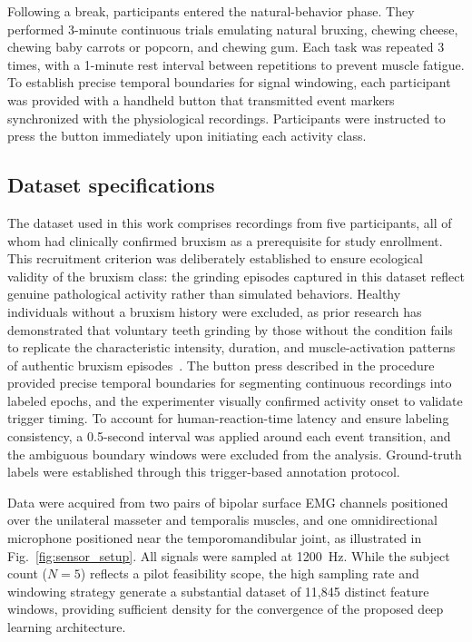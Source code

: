 \documentclass[pdflatex,sn-nature,iicol]{sn-jnl}
\begin{document}
Following a break, participants entered the natural-behavior phase. They performed 3-minute continuous trials emulating natural bruxing, chewing cheese, chewing baby carrots or popcorn, and chewing gum. Each task was repeated 3 times, with a 1-minute rest interval between repetitions to prevent muscle fatigue. To establish precise temporal boundaries for signal windowing, each participant was provided with a handheld button that transmitted event markers synchronized with the physiological recordings. Participants were instructed to press the button immediately upon initiating each activity class.

\subsection{Dataset specifications}

The dataset used in this work comprises recordings from five participants, all of whom had clinically confirmed bruxism as a prerequisite for study enrollment. This recruitment criterion was deliberately established to ensure ecological validity of the bruxism class: the grinding episodes captured in this dataset reflect genuine pathological activity rather than simulated behaviors. Healthy individuals without a bruxism history were excluded, as prior research has demonstrated that voluntary teeth grinding by those without the condition fails to replicate the characteristic intensity, duration, and muscle-activation patterns of authentic bruxism episodes~\cite{lavigne2008bruxism}. The button press described in the procedure provided precise temporal boundaries for segmenting continuous recordings into labeled epochs, and the experimenter visually confirmed activity onset to validate trigger timing. To account for human-reaction-time latency and ensure labeling consistency, a 0.5-second interval was applied around each event transition, and the ambiguous boundary windows were excluded from the analysis. Ground-truth labels were established through this trigger-based annotation protocol.

Data were acquired from two pairs of bipolar surface EMG channels positioned over the unilateral masseter and temporalis muscles, and one omnidirectional microphone positioned near the temporomandibular joint, as illustrated in Fig.~\ref{fig:sensor_setup}. All signals were sampled at 1200~Hz. While the subject count ($N=5$) reflects a pilot feasibility scope, the high sampling rate and windowing strategy generate a substantial dataset of 11,845 distinct feature windows, providing sufficient density for the convergence of the proposed deep learning architecture.
\end{document}
